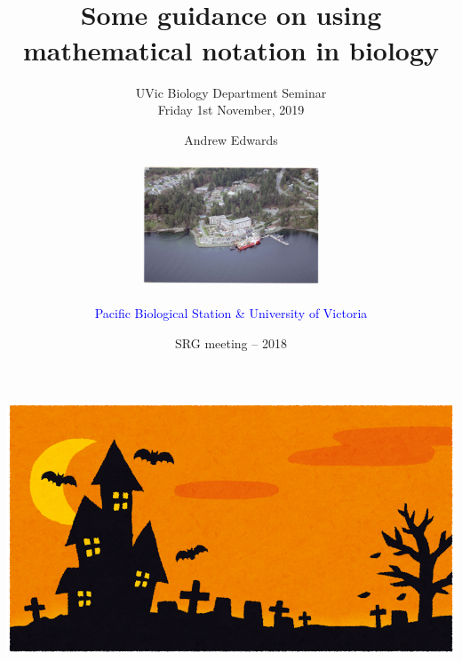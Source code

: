 

\title[Notation]{~\\ Some guidance on using mathematical notation in biology}
\author{Andrew Edwards\\ ~\\ \includegraphics[height=3.5cm]{images/pbs.png}\\
  ~\\ \textcolor{blue}{Pacific Biological Station \& University of Victoria}}
\date{{\footnotesize SRG meeting -- 2018}}
\subtitle{\small UVic Biology Department Seminar\\
Friday 1st November, 2019}

{\includegraphics[width=\paperwidth,height=\paperheight,keepaspectratio]{images/halloween_background_orange.png}}



\beamertemplatenavigationsymbolsempty   %

\frame[plain]{
\titlepage
}



